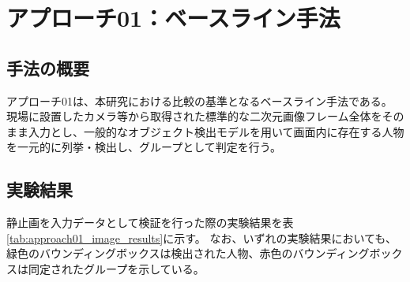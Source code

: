 \section{アプローチ01：ベースライン手法}

\subsection{手法の概要}
アプローチ01は、本研究における比較の基準となるベースライン手法である。
現場に設置したカメラ等から取得された標準的な二次元画像フレーム全体をそのまま入力とし、一般的なオブジェクト検出モデルを用いて画面内に存在する人物を一元的に列挙・検出し、グループとして判定を行う。

\subsection{実験結果}
静止画を入力データとして検証を行った際の実験結果を表\ref{tab:approach01_image_results}に示す。
なお、いずれの実験結果においても、緑色のバウンディングボックスは検出された人物、赤色のバウンディングボックスは同定されたグループを示している。

